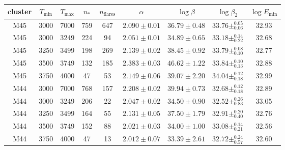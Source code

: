 \begin{tabular}{ccccccccc}
\toprule
   cluster &  $T_\mathrm{min}$ &  $T_\mathrm{max}$ &      $n_*$ &  $n_\mathrm{flares}$ &        $\alpha$ &     $\log\beta$ &             $\log\beta_2$ & $\log E_\mathrm{min}$ \\
\midrule
       M45 &              3000 &              7000 &        759 &                  647 &  $2.090\pm0.01$ &  $36.79\pm0.48$ &  $33.76\pm^{0.05}_{0.06}$ &                 32.93 \\
       M45 &              3000 &              3249 &        224 &                   94 &  $2.051\pm0.01$ &  $34.89\pm0.65$ &  $33.18\pm^{0.14}_{0.22}$ &                 32.68 \\
       M45 &              3250 &              3499 &        198 &                  269 &  $2.139\pm0.02$ &  $38.45\pm0.92$ &  $33.79\pm^{0.08}_{0.10}$ &                 32.77 \\
       M45 &              3500 &              3749 &        132 &                  185 &  $2.383\pm0.03$ &  $46.62\pm1.22$ &  $33.84\pm^{0.10}_{0.13}$ &                 32.88 \\
       M45 &              3750 &              4000 &         47 &                   53 &  $2.149\pm0.06$ &  $39.07\pm2.20$ &  $34.04\pm^{0.12}_{0.18}$ &                 32.99 \\
       M44 &              3000 &              7000 &        768 &                  157 &  $2.208\pm0.02$ &  $39.94\pm0.73$ &  $32.68\pm^{0.12}_{0.18}$ &                 32.89 \\
       M44 &              3000 &              3249 &        206 &                   22 &  $2.047\pm0.02$ &  $34.50\pm0.90$ &  $32.52\pm^{0.26}_{0.83}$ &                 33.05 \\
       M44 &              3250 &              3499 &        164 &                   55 &  $2.131\pm0.05$ &  $37.50\pm1.79$ &  $32.91\pm^{0.20}_{0.40}$ &                 32.76 \\
       M44 &              3500 &              3749 &        152 &                   88 &  $2.021\pm0.03$ &  $34.00\pm1.00$ &  $33.08\pm^{0.14}_{0.21}$ &                 32.56 \\
       M44 &              3750 &              4000 &         47 &                   13 &  $2.012\pm0.07$ &  $33.39\pm2.61$ &  $32.72\pm^{0.24}_{0.57}$ &                 32.60 \\
\bottomrule
\end{tabular}
